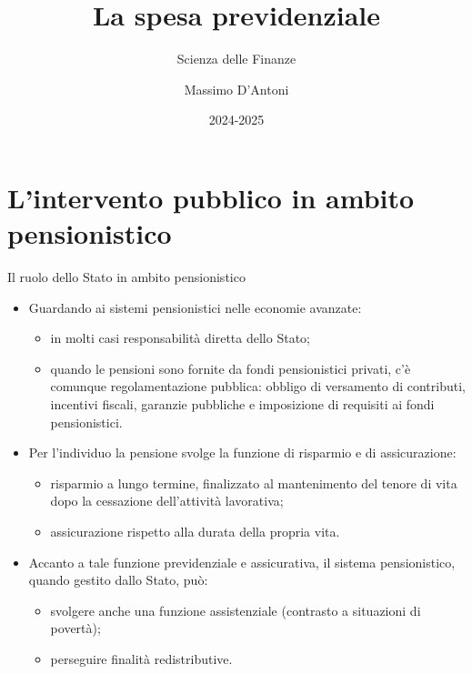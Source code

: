 \documentclass[aspectratio=64,12pt]{beamer}
\institute{Università di Siena}
\author{Massimo D'Antoni}
\date{2024-2025}
\title{La spesa previdenziale}
\subtitle{Scienza delle Finanze}
\begin{document}
\maketitle

\section{L'intervento pubblico in ambito pensionistico}

\begin{frame}{Il ruolo dello Stato in ambito pensionistico}
\begin{itemize}
\item Guardando ai sistemi pensionistici nelle economie avanzate:
\begin{itemize}
\item in molti casi responsabilità diretta dello Stato;
\item quando le pensioni sono fornite da fondi pensionistici privati, c'è
  comunque regolamentazione pubblica: obbligo di versamento di contributi,
  incentivi fiscali, garanzie pubbliche e imposizione di requisiti ai fondi
  pensionistici.
\end{itemize}

\item Per l'individuo la pensione svolge la funzione di \alert{risparmio} e di
  \alert{assicurazione}:
\begin{itemize}
\item risparmio a lungo termine, finalizzato al mantenimento del tenore di vita
dopo la cessazione dell'attività lavorativa;
\item assicurazione rispetto alla durata della propria vita.
\end{itemize}

\item Accanto a tale funzione \alert{previdenziale} e \alert{assicurativa}, il sistema
  pensionistico, quando gestito dallo Stato, può:
  \begin{itemize}
  \item svolgere anche una funzione
    \alert{assistenziale} (contrasto a situazioni di povertà);
  \item perseguire finalità
\alert{redistributive}.
\end{itemize}
\end{itemize}
\end{frame}
\end{document}
